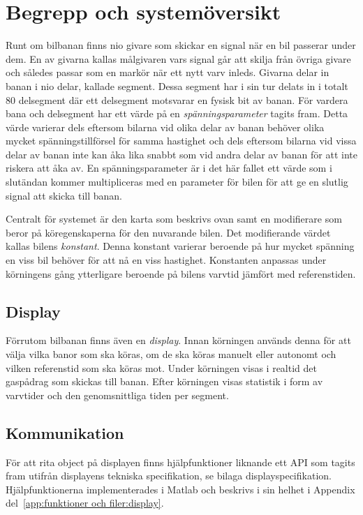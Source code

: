 \section{Begrepp och systemöversikt}
\label{sec:begrepp och systemöversikt}

Runt om bilbanan finns nio givare som skickar en signal när en bil passerar under
dem. En av givarna kallas målgivaren vars signal går att skilja från övriga
givare och således passar som en markör när ett nytt varv inleds. Givarna
delar in banan i nio delar, kallade segment. Dessa segment har i sin tur delats
in i totalt 80 delsegment där ett delsegment motsvarar en fysisk bit av banan.
För vardera bana och delsegment har ett värde på en \emph{spänningsparameter}
tagits fram. Detta värde varierar dels eftersom bilarna vid olika delar av banan
behöver olika mycket spänningstillförsel för samma hastighet och dels eftersom
bilarna vid vissa delar av banan inte kan åka lika snabbt som vid andra delar av
banan för att inte riskera att åka av. En spänningsparameter är i det här fallet
ett värde som i slutändan kommer multipliceras med en parameter för bilen för
att ge en slutlig signal att skicka till banan.

Centralt för systemet är den karta som beskrivs ovan samt en
modifierare som beror på köregenskaperna för den nuvarande bilen. Det
modifierande värdet kallas bilens \emph{konstant}. Denna konstant varierar
beroende på hur mycket spänning en viss bil behöver för att nå en viss
hastighet. Konstanten anpassas under körningens gång ytterligare beroende på
bilens varvtid jämfört med referenstiden.

\subsection{Display}

Förrutom bilbanan finns även en \emph{display}. Innan körningen används denna för att välja vilka banor som ska köras, om de ska köras manuelt eller autonomt och vilken referenstid som ska köras mot. Under körningen visas i realtid det gaspådrag som skickas till banan. Efter körningen visas statistik i form av varvtider och den genomsnittliga tiden per segment.

\subsection{Kommunikation}

För att rita object på displayen finns hjälpfunktioner liknande ett API som
tagits fram utifrån displayens tekniska specifikation, se bilaga displayspecifikation.
Hjälpfunktionerna implementerades i Matlab och beskrivs i sin helhet i Appendix
del~\ref{app:funktioner och filer:display}.

